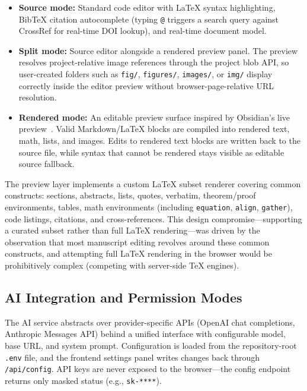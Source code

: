 \begin{itemize}
  \item \textbf{Source mode:} Standard code editor with \LaTeX{} syntax
  highlighting, BibTeX citation autocomplete (typing \texttt{@} triggers a
  search query against CrossRef for real-time DOI lookup), and real-time
  document model.

  \item \textbf{Split mode:} Source editor alongside a rendered preview panel.
  The preview resolves project-relative image references through the project
  blob API, so user-created folders such as \texttt{fig/}, \texttt{figures/},
  \texttt{images/}, or \texttt{img/} display correctly inside the editor
  preview without browser-page-relative URL resolution.

  \item \textbf{Rendered mode:} An editable preview surface inspired by
  Obsidian's live preview~\cite{obsidian}. Valid Markdown/\LaTeX{} blocks are compiled into
  rendered text, math, lists, and images. Edits to rendered text blocks are
  written back to the source file, while syntax that cannot be rendered stays
  visible as editable source fallback.
\end{itemize}

The preview layer implements a custom \LaTeX{} subset renderer covering common
constructs: sections, abstracts, lists, quotes, verbatim, theorem/proof
environments, tables, math environments (including \texttt{equation},
\texttt{align}, \texttt{gather}), code listings, citations, and cross-references.
This design compromise---supporting a curated subset rather than full \LaTeX{}
rendering---was driven by the observation that most manuscript editing revolves
around these common constructs, and attempting full \LaTeX{} rendering in the
browser would be prohibitively complex (competing with server-side \TeX{}
engines).

\subsection{AI Integration and Permission Modes}

The AI service abstracts over provider-specific APIs (OpenAI chat completions,
Anthropic Messages API) behind a unified interface with configurable model,
base URL, and system prompt. Configuration is loaded from the repository-root
\texttt{.env} file, and the frontend settings panel writes changes back through
\texttt{/api/config}. API keys are never exposed to the browser---the config
endpoint returns only masked status (e.g., \texttt{sk-****}).

